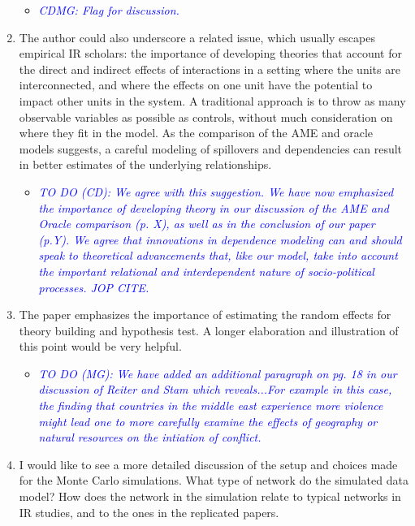 \begin{enumerate}
\begin{itemize}
		\item \textcolor{blue}{ \emph{
		CDMG: Flag for discussion.
		}}
	\end{itemize}
	\item The author could also underscore a related issue, which usually escapes empirical IR scholars: the importance of developing theories that account for the direct and indirect effects of interactions in a setting where the units are interconnected, and where the effects on one unit have the potential to impact other units in the system. A traditional approach is to throw as many observable variables as possible as controls, without much consideration on where they fit in the model. As the comparison of the AME and oracle models suggests, a careful modeling of spillovers and dependencies can result in better estimates of the underlying relationships.
	\begin{itemize}
		\item \textcolor{blue}{ \emph{
		TO DO (CD): We agree with this suggestion. We have now emphasized the importance of developing theory in our discussion of the AME and Oracle comparison (p. X), as well as in the conclusion of our paper (p.Y). We agree that innovations in dependence modeling can and should speak to theoretical advancements that, like our model, take into account the important relational and interdependent nature of socio-political processes. JOP CITE.
		}}
	\end{itemize}
	\item The paper emphasizes the importance of estimating the random effects for theory building and hypothesis test. A longer elaboration and illustration of this point would be very helpful.
	\begin{itemize}
		\item \textcolor{blue}{ \emph{
		TO DO (MG): We have added an additional paragraph on pg. 18 in our discussion of Reiter and Stam which reveals...For example in this case, the finding that countries in the middle east experience more violence might lead one to more carefully examine the effects of geography or natural resources on the intiation of conflict. 
		}}
	\end{itemize}
	\item I would like to see a more detailed discussion of the setup and choices made for the Monte Carlo simulations. What type of network do the simulated data model? How does the network in the simulation relate to typical networks in IR studies, and to the ones in the replicated papers.
	\begin{itemize}

\end{itemize}
\end{enumerate}

